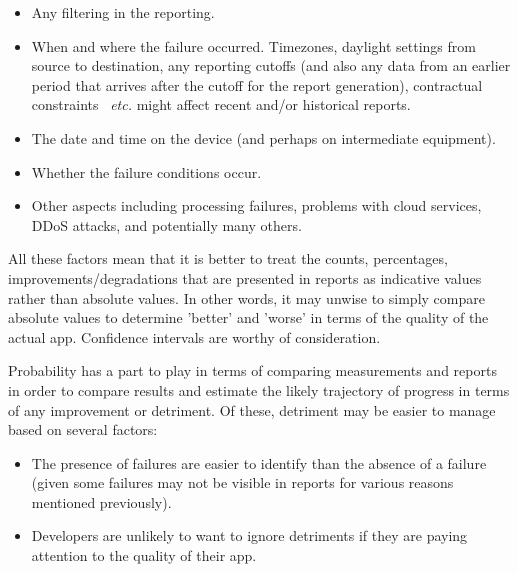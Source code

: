 \begin{itemize}
    \item Any filtering in the reporting.
    \item When and where the failure occurred. Timezones, daylight settings from source to destination, any reporting cutoffs (and also any data from an earlier period that arrives after the cutoff for the report generation), contractual constraints~ \emph{etc.} might affect recent and/or historical reports.
    \item The date and time on the device (and perhaps on intermediate equipment).
    \item Whether the failure conditions occur.
    \item Other aspects including processing failures, problems with cloud services, DDoS attacks, and potentially many others.
\end{itemize}

All these factors mean that it is better to treat the counts, percentages, improvements/degradations that are presented in reports as indicative values rather than absolute values. In other words, it may unwise to simply compare absolute values to determine 'better' and 'worse' in terms of the quality of the actual app. Confidence intervals are worthy of consideration. 

Probability has a part to play in terms of comparing measurements and reports in order to compare results and estimate the likely trajectory of progress in terms of any improvement or detriment. Of these, detriment may be easier to manage based on several factors:

\begin{itemize}
    \item The presence of failures are easier to identify than the absence of a failure (given some failures may not be visible in reports for various reasons mentioned previously).
    \item Developers are unlikely to want to ignore detriments if they are paying attention to the quality of their app.
\end{itemize}

